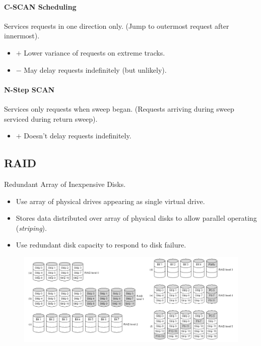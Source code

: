 \documentclass[twocolumn,english]{article}
\begin{document}
\paragraph{C-SCAN Scheduling}

Services requests in one direction only. (Jump to outermost request
after innermost).
\begin{itemize}
\item $+$ Lower variance of requests on extreme tracks.
\item $-$ May delay requests indefinitely (but unlikely).
\end{itemize}

\paragraph{N-Step SCAN}

Services only requests when sweep began. (Requests arriving during
sweep serviced during return sweep).
\begin{itemize}
\item $+$ Doesn't delay requests indefinitely.
\end{itemize}

\subsection{RAID}

Redundant Array of Inexpensive Disks.
\begin{itemize}
\item Use array of physical drives appearing as single virtual drive.
\item Stores data distributed over array of physical disks to allow parallel
operating (\emph{striping}).
\item Use redundant disk capacity to respond to disk failure.
\end{itemize}
\begin{figure}[H]
\centering{}\includegraphics[width=0.95\linewidth]{img/raid}
\end{figure}
\end{document}
